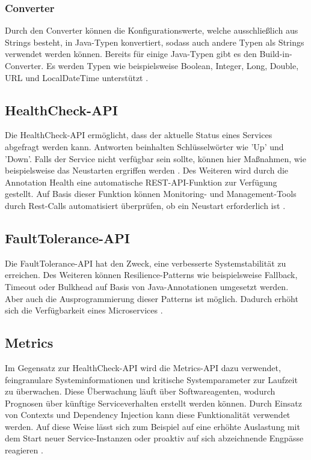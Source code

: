 \subsubsection{Converter}
Durch den Converter können die Konfigurationswerte, welche ausschließlich aus Strings besteht, in Java-Typen konvertiert, sodass auch andere Typen als Strings verwendet werden können. Bereits für einige Java-Typen gibt es den Build-in-Converter. Es werden Typen wie beispielsweise Boolean, Integer, Long, Double, URL und LocalDateTime unterstützt \cite{LarsRowekamp.2017}.

\subsection{HealthCheck-API} \label{healthcheck}
Die HealthCheck-API ermöglicht, dass der aktuelle Status eines Services abgefragt werden kann. Antworten beinhalten Schlüsselwörter wie 'Up' und 'Down'. Falls der Service nicht verfügbar sein sollte, können hier Maßnahmen, wie beispielsweise das Neustarten ergriffen werden \cite{LarsRowekamp.2017}. Des Weiteren wird durch die Annotation  Health eine automatische REST-API-Funktion zur Verfügung gestellt. Auf Basis dieser Funktion können Monitoring- und Management-Tools durch Rest-Calls automatisiert überprüfen, ob ein Neustart erforderlich ist \cite{LarsRowekamp.2017c}.  

\subsection{FaultTolerance-API} \label{faulttolerance}
Die FaultTolerance-API hat den Zweck, eine verbesserte Systemstabilität zu erreichen. Des Weiteren können Resilience-Patterns wie beispielsweise Fallback, Timeout oder Bulkhead auf Basis von Java-Annotationen umgesetzt werden. Aber auch die Ausprogrammierung dieser Patterns ist möglich. Dadurch erhöht sich die Verfügbarkeit eines Microservices \cite{ibm.2017}.

\subsection{Metrics}
Im Gegensatz zur HealthCheck-API wird die Metrics-API dazu verwendet, feingranulare Systeminformationen und kritische Systemparameter zur Laufzeit zu überwachen. Diese Überwachung läuft über Softwareagenten, wodurch Prognosen über künftige Serviceverhalten erstellt werden können. Durch Einsatz von Contexts und Dependency Injection kann diese Funktionalität verwendet werden. Auf diese Weise lässt sich zum Beispiel auf eine erhöhte Auslastung mit dem Start neuer Service-Instanzen oder proaktiv auf sich abzeichnende Engpässe reagieren \cite{LarsRowekamp.2017c}. 

